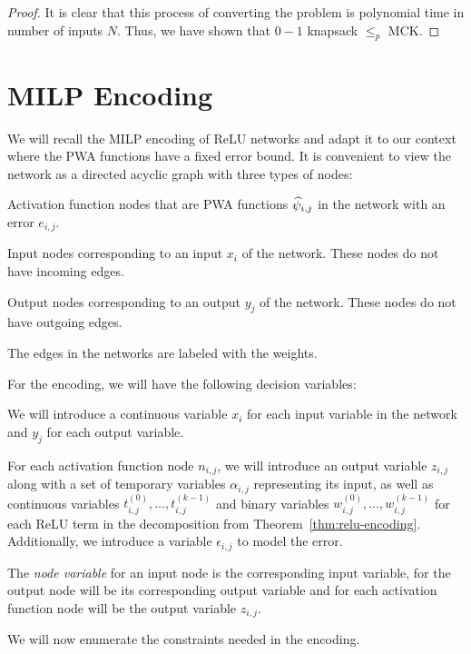 \begin{proof}
    It is clear that this process of converting the problem is polynomial time in number of inputs $N$. Thus, we have shown that $0-1$ knapsack $\leq_p$ MCK.
\end{proof}

\section{MILP Encoding}\label{sec:milp-encoding}

We will recall the MILP encoding of ReLU networks and adapt it to our context where the PWA functions have a fixed error bound. It is convenient to view the network as a directed acyclic graph with three types of nodes:
\begin{compactenum}
\item Activation function nodes that are PWA functions $\widehat{\psi}_{i,j}$ in the network with an error $e_{i,j}$.
\item Input nodes corresponding to an input $x_i$ of the network. These nodes do not have incoming edges.
\item Output nodes corresponding to an output $y_j$ of the network. These nodes do not have outgoing edges. 
\end{compactenum}

The edges in the networks are labeled with the weights.

For the encoding, we will have the following decision variables:
\begin{compactenum}
    \item We will introduce a continuous variable $x_i$ for each input variable in the network and $y_j$ for each output variable.
    \item For each activation function node $n_{i,j}$, we will introduce an output variable $z_{i,j}$ along with a set of temporary variables $\alpha_{i,j}$ representing its input, as well as continuous variables $t_{i,j}^{(0)}, \ldots, t_{i,j}^{(k-1)}$  and binary variables $w_{i,j}^{(0)}, \ldots, w_{i,j}^{(k-1)}$ for each ReLU term in the decomposition from Theorem~\ref{thm:relu-encoding}. Additionally, we introduce a variable $\epsilon_{i,j}$ to model the error.
\end{compactenum}

The \emph{node variable} for an input node is the corresponding input variable, for the output node will be its corresponding output variable and for each activation function node will be the output variable $z_{i,j}$.

We will now enumerate the constraints needed in the encoding.

